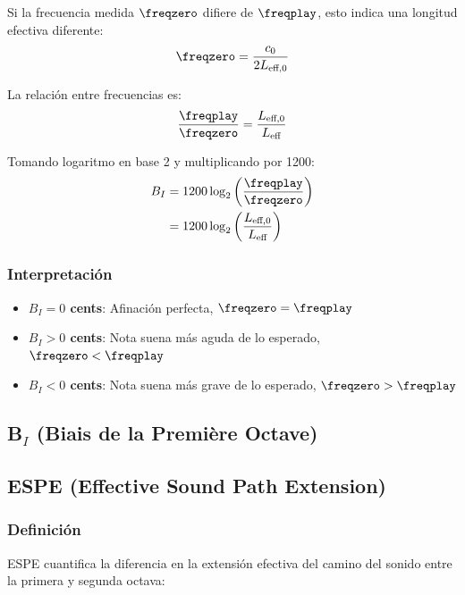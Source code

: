Si la frecuencia medida $\freqzero$ difiere de $\freqplay$, esto indica una longitud efectiva diferente:
\begin{equation}
\freqzero = \frac{c_0}{2 L_{\text{eff},0}}
\end{equation}

La relación entre frecuencias es:
\begin{equation}
\frac{\freqplay}{\freqzero} = \frac{L_{\text{eff},0}}{L_{\text{eff}}}
\end{equation}

Tomando logaritmo en base 2 y multiplicando por 1200:
\begin{align}
B_I &= 1200 \log_2\left(\frac{\freqplay}{\freqzero}\right) \\
&= 1200 \log_2\left(\frac{L_{\text{eff},0}}{L_{\text{eff}}}\right)
\end{align}

\subsubsection{Interpretación}

\begin{itemize}
    \item \textbf{$B_I = 0$ cents}: Afinación perfecta, $\freqzero = \freqplay$
    \item \textbf{$B_I > 0$ cents}: Nota suena más aguda de lo esperado, $\freqzero < \freqplay$
    \item \textbf{$B_I < 0$ cents}: Nota suena más grave de lo esperado, $\freqzero > \freqplay$
\end{itemize}

\subsection{B$_I$ (Biais de la Première Octave)}


\subsection{ESPE (Effective Sound Path Extension)}

\subsubsection{Definición}

ESPE cuantifica la diferencia en la extensión efectiva del camino del sonido entre la primera y segunda octava:

